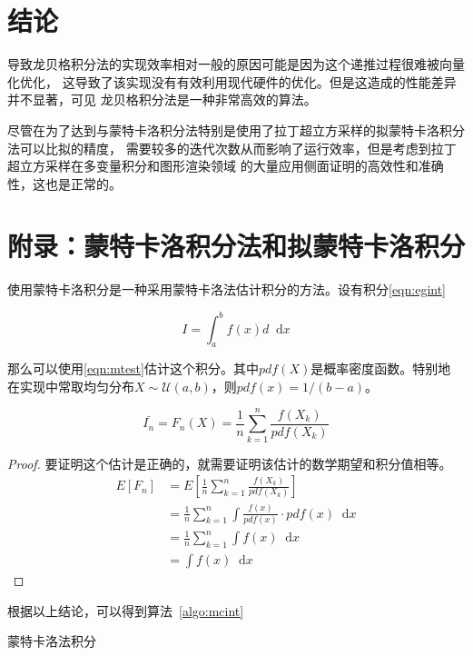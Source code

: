 \documentclass[a4paper,twoside]{article}
\newcommand*{\dif}{\mathop{}\!\mathrm{d}}
\begin{document}
\begin{spacing}{1.2}
\section{结论}

导致龙贝格积分法的实现效率相对一般的原因可能是因为这个递推过程很难被向量化优化，
这导致了该实现没有有效利用现代硬件的优化。但是这造成的性能差异并不显著，可见
龙贝格积分法是一种非常高效的算法。

尽管在为了达到与蒙特卡洛积分法特别是使用了拉丁超立方采样的拟蒙特卡洛积分法可以比拟的精度，
需要较多的迭代次数从而影响了运行效率，但是考虑到拉丁超立方采样在多变量积分和图形渲染领域
的大量应用侧面证明的高效性和准确性，这也是正常的。


\clearpage

\appendix

\section{附录：蒙特卡洛积分法和拟蒙特卡洛积分}

使用蒙特卡洛积分是一种采用蒙特卡洛法估计积分的方法。设有积分\eqref{eqn:egint}

\begin{equation}
	\label{eqn:egint}
	I=\int_a^b f(x)d \dif x
\end{equation}

那么可以使用\eqref{eqn:mtest}估计这个积分。其中$pdf(X)$是概率密度函数。特别地
在实现中常取均匀分布$X\sim \mathcal{U}(a,b)$，则$pdf(x)=1/(b-a)$。

\begin{equation}
	\label{eqn:mtest}
	\bar{I_n}=F_n(X)=\frac{1}{n}\sum_{k=1}^n\frac{f(X_k)}{pdf(X_k)}
\end{equation}

\begin{proof}
	要证明这个估计是正确的，就需要证明该估计的数学期望和积分值相等。
\begin{align*}
	E[F_n]&=E\left[\frac{1}{n}\sum_{k=1}^n\frac{f(X_k)}{pdf(X_k)}\right]\\
	&=\frac{1}{n}\sum_{k=1}^n\int \frac{f(x)}{pdf(x)} \cdot pdf(x) \dif x\\
	&=\frac{1}{n}\sum_{k=1}^n\int f(x) \dif x\\
	&=\int f(x) \dif x
\end{align*}
\end{proof}
根据以上结论，可以得到算法~\ref{algo:mcint}

\begin{algorithm}
	\caption{蒙特卡洛法积分}
	\label{algo:mcint}
	\begin{algorithmic}[1]
		

\end{algorithmic}
\end{algorithm}
\end{spacing}
\end{document}
